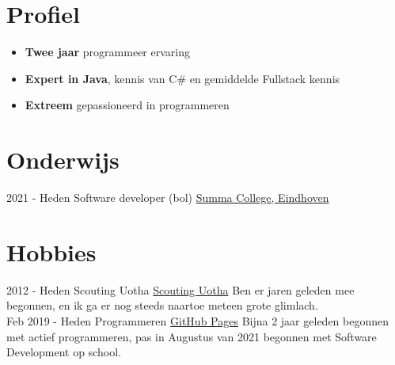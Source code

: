 \documentclass[letterpaper]{twentysecondcv} %
\begin{document}
    \makesidebarFirst %



    \section{Profiel}

    \begin{itemize}
        \item \textbf{Twee jaar} programmeer ervaring
        \item \textbf{Expert in Java}, kennis van C\# en gemiddelde Fullstack kennis
        \item \textbf{Extreem} gepassioneerd in programmeren
    \end{itemize}

    \vspace{6mm}




    \section{Onderwijs}

    \begin{twenty} %
        \twentyitem
        {2021 - Heden}
        {}
        {Software developer (bol)}
        {\href{https://www.summacollege.nl/}{Summa College, Eindhoven}}
        {}
        {}
    \end{twenty}



    \section{Hobbies}

    \begin{twenty} %
        \twentyitem
        {2012 -}
        {Heden}
        {Scouting Uotha}
        {\href{https://www.uotha.nl/}{Scouting Uotha}}
        {}
        { Ben er jaren geleden mee begonnen, en ik ga er nog steeds naartoe meteen grote glimlach.}\\
        \twentyitem
        {Feb 2019 -}
        {Heden}
        {Programmeren}
        {\href{https://tais993.github.io/}{GitHub Pages}}
        {}
        {Bijna 2 jaar geleden begonnen met actief programmeren, pas in Augustus van 2021 begonnen met Software Development op school.}
    \end{twenty}
\end{document}
